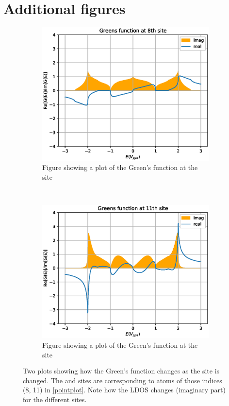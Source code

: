 \section{Additional figures}\label{appfigs}
\begin{figure}[h]
	\centering
	\begin{subfigure}[b]{0.45\textwidth}
		\includegraphics[width=\textwidth]{Figures/BetaimrealTE8.eps}
		\caption{Figure showing a plot of the Green's function at the  site}
		\label{4th}
	\end{subfigure}
	~ %
	\begin{subfigure}[b]{0.45\textwidth}
		\includegraphics[width=\textwidth]{Figures/BetaimrealTE11.eps}
		\caption{Figure showing a plot of the Green's function at the  site}
		\label{7th}
	\end{subfigure}
	\caption{Two plots showing how the Green's function changes as the site is changed. The  and  sites are corresponding to atoms of those indices (8, 11) in \cref{pointplot}. Note how the LDOS changes (imaginary part) for the different sites.}\label{siteLDOSplot}
\end{figure}
